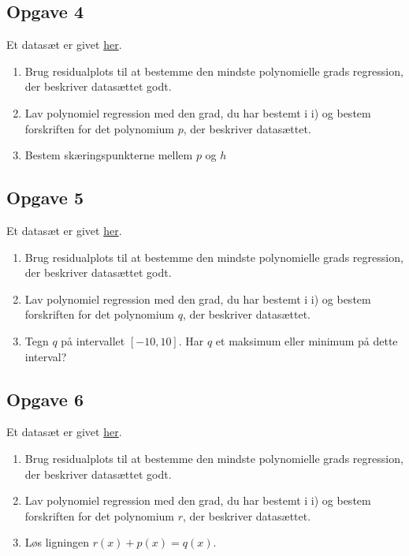 \subsection*{Opgave 4}
	Et datasæt er givet \href{https://github.com/ChristianJLex/TeachingNotes/raw/master/2023-2024/Data og lign/poly_opgave4.xlsx}{\color{blue!60} her}.
	\begin{enumerate}[label=\roman*)]
		\item Brug residualplots til at bestemme den mindste polynomielle grads regression, 
		der beskriver datasættet godt. 
		\item Lav polynomiel regression med den grad, du har bestemt i i) og bestem 
		forskriften for det polynomium $p$, der beskriver datasættet.
		\item Bestem skæringspunkterne mellem $p$ og $h$
	\end{enumerate}
	
\subsection*{Opgave 5}
	Et datasæt er givet \href{https://github.com/ChristianJLex/TeachingNotes/raw/master/2023-2024/Data og lign/poly_opgave5.xlsx}{\color{blue!60} her}.
	\begin{enumerate}[label=\roman*)]
		\item Brug residualplots til at bestemme den mindste polynomielle grads regression, 
		der beskriver datasættet godt. 
		\item Lav polynomiel regression med den grad, du har bestemt i i) og bestem 
		forskriften for det polynomium $q$, der beskriver datasættet.
		\item Tegn $q$ på intervallet $[-10,10]$. Har $q$ et maksimum eller minimum på dette interval?
	\end{enumerate}

\subsection*{Opgave 6}
	Et datasæt er givet \href{https://github.com/ChristianJLex/TeachingNotes/raw/master/2023-2024/Data og lign/poly_opgave6.xlsx}{\color{blue!60} her}.
	\begin{enumerate}[label=\roman*)]
		\item Brug residualplots til at bestemme den mindste polynomielle grads regression, 
		der beskriver datasættet godt. 
		\item Lav polynomiel regression med den grad, du har bestemt i i) og bestem 
		forskriften for det polynomium $r$, der beskriver datasættet.
		\item Løs ligningen $r(x) + p(x) = q(x)$.
	\end{enumerate}
